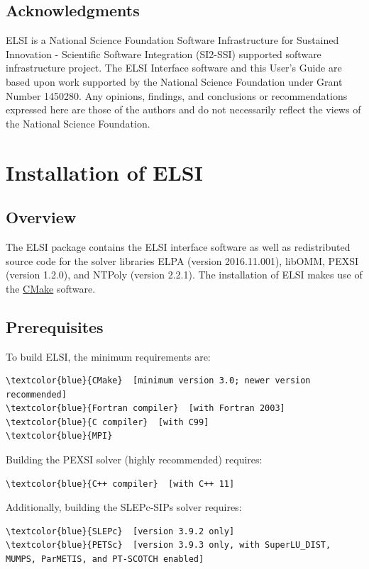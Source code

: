 \documentclass{report}
\begin{document}
\section{Acknowledgments}
\label{sec:thanks}
ELSI is a National Science Foundation Software Infrastructure for Sustained Innovation - Scientific Software Integration (SI2-SSI) supported software infrastructure project.  The ELSI Interface software and this User's Guide are based upon work supported by the National Science Foundation under Grant Number 1450280.  Any opinions, findings, and conclusions or recommendations expressed here are those of the authors and do not necessarily reflect the views of the National Science Foundation.

\chapter{Installation of ELSI}
\section{Overview}
\label{sec:install}
The ELSI package contains the ELSI interface software as well as redistributed source code for the solver libraries ELPA (version 2016.11.001), libOMM, PEXSI (version 1.2.0), and NTPoly (version 2.2.1).  The installation of ELSI makes use of the \href{http://cmake.org}{CMake} software.

\section{Prerequisites}
\label{sec:prereq}
To build ELSI, the minimum requirements are:
\begin{Verbatim}[commandchars=\\\{\}]
\textcolor{blue}{CMake}  [minimum version 3.0; newer version recommended]
\textcolor{blue}{Fortran compiler}  [with Fortran 2003]
\textcolor{blue}{C compiler}  [with C99]
\textcolor{blue}{MPI}
\end{Verbatim}

Building the PEXSI solver (highly recommended) requires:
\begin{Verbatim}[commandchars=\\\{\}]
\textcolor{blue}{C++ compiler}  [with C++ 11]
\end{Verbatim}

Additionally, building the SLEPc-SIPs solver requires:
\begin{Verbatim}[commandchars=\\\{\}]
\textcolor{blue}{SLEPc}  [version 3.9.2 only]
\textcolor{blue}{PETSc}  [version 3.9.3 only, with SuperLU_DIST, MUMPS, ParMETIS, and PT-SCOTCH enabled]
\end{Verbatim}
\end{document}

